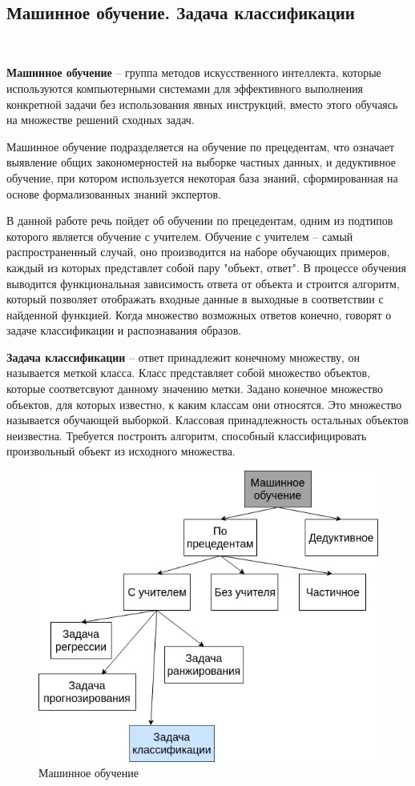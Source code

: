 \
\subsection{Машинное обучение. Задача классификации}
\

\textbf{Машинное обучение} – группа методов искусственного интеллекта, которые используются компьютерными системами для эффективного выполнения конкретной задачи без использования явных инструкций, вместо этого обучаясь на множестве решений сходных задач.

Машинное обучение подразделяется на обучение по прецедентам, что означает выявление общих закономерностей на выборке частных данных, и дедуктивное обучение, при котором используется некоторая база знаний, сформированная на основе формализованных знаний экспертов.

В данной работе речь пойдет об обучении по прецедентам, одним из подтипов которого является обучение с учителем. Обучение с учителем – самый распространенный случай, оно производится на наборе обучающих примеров, каждый из которых представлет собой пару "объект, ответ". В процессе обучения выводится функциональная зависимость ответа от объекта и строится алгоритм, который позволяет отображать входные данные в выходные в соответствии с найденной функцией. Когда множество возможных ответов конечно, говорят о задаче классификации и распознавания образов.

\textbf{Задача классификации} – ответ принадлежит конечному множеству, он называется меткой класса. Класс представляет собой множество объектов, которые соответсвуют данному значению метки. Задано конечное множество объектов, для которых известно, к каким классам они относятся. Это множество называется обучающей выборкой. Классовая принадлежность остальных объектов неизвестна. Требуется построить алгоритм, способный классифицировать произвольный объект из исходного множества.

  \begin{figure}[h!]
    \centering
    \setlength{\fboxsep}{5pt}
    \includegraphics[width=.9\textwidth]{img/ml}
    \vspace*{6pt}
    \caption{Машинное обучение}\label{fig:project-tree}
  \end{figure}

